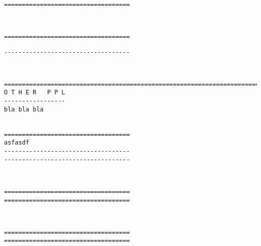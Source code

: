 \

\goodbreak \begin{samepage} \small \begin{verbatim}
===================================
\end{verbatim} \normalsize \end{samepage}

\

\goodbreak \begin{samepage} \small \begin{verbatim}
===================================
\end{verbatim} \end{samepage} \goodbreak \begin{samepage} \begin{verbatim}
-----------------------------------
\end{verbatim} \normalsize \end{samepage}

\







\goodbreak
 {}

\goodbreak \begin{samepage} \small \begin{verbatim}
================================================================================
O T H E R   P P L
-----------------
bla bla bla


===================================
asfasdf
-----------------------------------
-----------------------------------
\end{verbatim} \normalsize \end{samepage}

\

\goodbreak \begin{samepage} \small \begin{verbatim}
===================================
===================================
\end{verbatim} \normalsize \end{samepage}

\

\goodbreak \begin{samepage} \small \begin{verbatim}
===================================
===================================
\end{verbatim} \normalsize \end{samepage}

